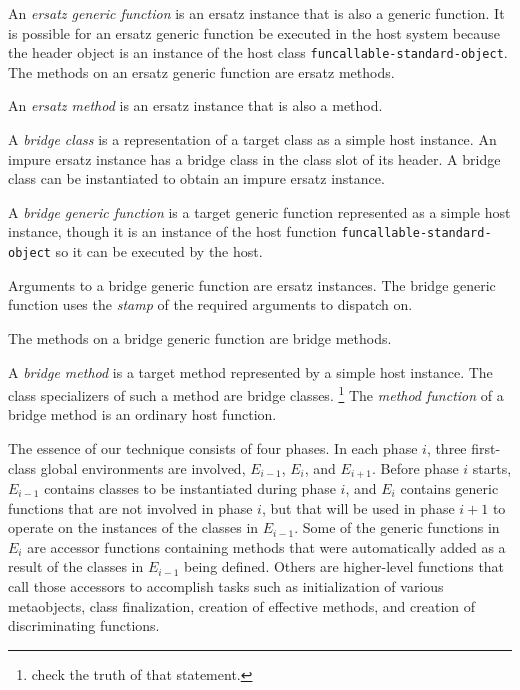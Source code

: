 \begin{definition}
An \emph{ersatz generic function} is an ersatz instance that is also a
generic function.  It is possible for an ersatz generic function be
executed in the host system because the header object is an instance
of the host class \texttt{funcallable-standard-object}.  The methods
on an ersatz generic function are ersatz methods.
\end{definition}

\begin{definition}
An \emph{ersatz method} is an ersatz instance that is also a method.
\end{definition}

\begin{definition}
A \emph{bridge class} is a representation of a target class as a
simple host instance.  An impure ersatz instance has a bridge class in
the class slot of its header.  A bridge class can be instantiated to
obtain an impure ersatz instance.
\end{definition}

\begin{definition}
A \emph{bridge generic function} is a target generic function
represented as a simple host instance, though it is an instance of the
host function \texttt{funcallable-standard-object} so it can be
executed by the host.

Arguments to a bridge generic function are ersatz instances.  The
bridge generic function uses the
\emph{stamp}
 of
the required arguments to dispatch on.

The methods on a bridge generic function are bridge methods.
\end{definition}

\begin{definition}
A \emph{bridge method} is a target method represented by a simple host
instance.  The class specializers of such a method are bridge classes.%
\footnote{check the truth of that statement.}
The \emph{method function} of a bridge method is an ordinary host
function.
\end{definition}

The essence of our technique consists of four phases.  In each phase
$i$, three first-class global environments are involved, $E_{i-1}$,
$E_{i}$, and $E_{i+1}$.  Before phase $i$ starts, $E_{i-1}$ contains
classes to be instantiated during phase $i$, and $E_i$ contains
generic functions that are not involved in phase $i$, but that will be
used in phase $i+1$ to operate on the instances of the classes in
$E_{i-1}$.  Some of the generic functions in $E_i$ are accessor
functions containing methods that were automatically added as a result
of the classes in $E_{i-1}$ being defined.  Others are higher-level
functions that call those accessors to accomplish tasks such as
initialization of various metaobjects, class finalization, creation of
effective methods, and creation of discriminating functions.

